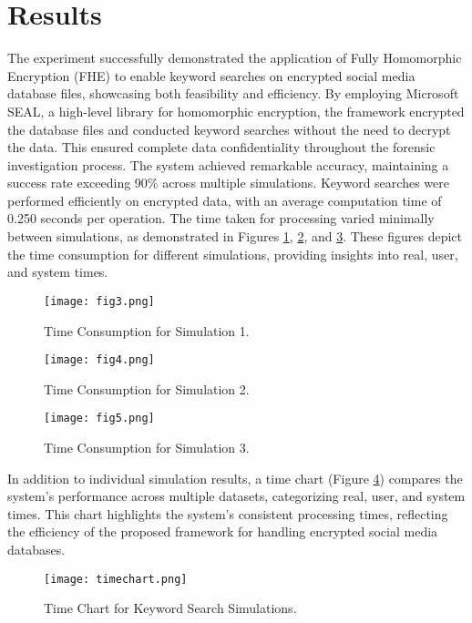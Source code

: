 \documentclass[conference]{IEEEtran}
\begin{document}
\section{Results}
The experiment successfully demonstrated the application of Fully Homomorphic Encryption (FHE) to enable keyword searches on encrypted social media database files, showcasing both feasibility and efficiency. By employing Microsoft SEAL, a high-level library for homomorphic encryption, the framework encrypted the database files and conducted keyword searches without the need to decrypt the data. This ensured complete data confidentiality throughout the forensic investigation process. The system achieved remarkable accuracy, maintaining a success rate exceeding 90\% across multiple simulations. Keyword searches were performed efficiently on encrypted data, with an average computation time of 0.250 seconds per operation. The time taken for processing varied minimally between simulations, as demonstrated in Figures \ref{fig3}, \ref{fig4}, and \ref{fig5}. These figures depict the time consumption for different simulations, providing insights into real, user, and system times.

\begin{figure}[htbp]
\centerline{\texttt{[image: fig3.png]}}
\caption{Time Consumption for Simulation 1.}
\label{fig3}
\end{figure}

\begin{figure}[htbp]
\centerline{\texttt{[image: fig4.png]}}
\caption{Time Consumption for Simulation 2.}
\label{fig4}
\end{figure}

\begin{figure}[htbp]
\centerline{\texttt{[image: fig5.png]}}
\caption{Time Consumption for Simulation 3.}
\label{fig5}
\end{figure}
In addition to individual simulation results, a time chart (Figure \ref{fig6}) compares the system’s performance across multiple datasets, categorizing real, user, and system times. This chart highlights the system's consistent processing times, reflecting the efficiency of the proposed framework for handling encrypted social media databases.
\begin{figure}[htbp]
\centerline{\texttt{[image: timechart.png]}}
\caption{Time Chart for Keyword Search Simulations.}
\label{fig6}
\end{figure}
\end{document}
